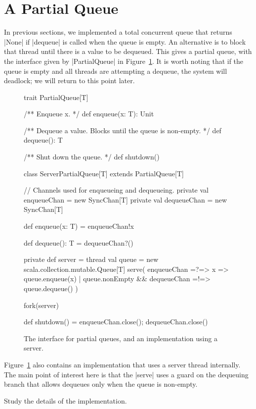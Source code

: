 \section{A Partial Queue}

In previous sections, we implemented a total concurrent queue that returns
|None| if |dequeue| is called when the queue is empty.  
%
An alternative is to block that thread until there is a value to be dequeued.
This gives a partial queue, with the interface given by |PartialQueue| in
Figure~\ref{fig:partial-queue}.  It is worth noting that if the queue is empty
and all threads are attempting a dequeue, the system will deadlock; we will
return to this point later.


\begin{figure}
\begin{scala}
trait PartialQueue[T]{
  /** Enqueue x. */
  def enqueue(x: T): Unit

  /** Dequeue a value.  Blocks until the queue is non-empty. */
  def dequeue(): T

  /** Shut down the queue. */
  def shutdown()
}

class ServerPartialQueue[T] extends PartialQueue[T]{
  // Channels used for enqueueing and dequeueing.
  private val enqueueChan = new SyncChan[T]
  private val dequeueChan = new SyncChan[T]

  def enqueue(x: T) = enqueueChan!x

  def dequeue(): T = dequeueChan?()

  private def server = thread{
    val queue = new scala.collection.mutable.Queue[T]
    serve(
      enqueueChan =?=> { x => queue.enqueue(x) }
      | queue.nonEmpty && dequeueChan =!=> queue.dequeue()
    )
  }

  fork(server)

  def shutdown() = { enqueueChan.close(); dequeueChan.close() }
}
\end{scala}
\caption{The interface for partial queues, and an implementation using a
  server.}
\label{fig:partial-queue}
\end{figure}


Figure~\ref{fig:partial-queue} also contains an implementation that uses a
server thread internally.  The main point of interest here is that the |serve|
uses a guard on the dequeuing branch that allows dequeues only when the queue
is non-empty. 

\begin{instruction}
Study the details of the implementation.
\end{instruction}

